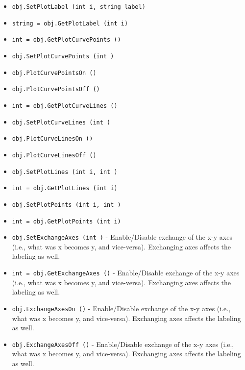 \begin{itemize}
\item  \verb|obj.SetPlotLabel (int i, string label)|

\item  \verb|string = obj.GetPlotLabel (int i)|

\item  \verb|int = obj.GetPlotCurvePoints ()|

\item  \verb|obj.SetPlotCurvePoints (int )|

\item  \verb|obj.PlotCurvePointsOn ()|

\item  \verb|obj.PlotCurvePointsOff ()|

\item  \verb|int = obj.GetPlotCurveLines ()|

\item  \verb|obj.SetPlotCurveLines (int )|

\item  \verb|obj.PlotCurveLinesOn ()|

\item  \verb|obj.PlotCurveLinesOff ()|

\item  \verb|obj.SetPlotLines (int i, int )|

\item  \verb|int = obj.GetPlotLines (int i)|

\item  \verb|obj.SetPlotPoints (int i, int )|

\item  \verb|int = obj.GetPlotPoints (int i)|

\item  \verb|obj.SetExchangeAxes (int )| -  Enable/Disable exchange of the x-y axes (i.e., what was x becomes y, and
 vice-versa). Exchanging axes affects the labeling as well.

\item  \verb|int = obj.GetExchangeAxes ()| -  Enable/Disable exchange of the x-y axes (i.e., what was x becomes y, and
 vice-versa). Exchanging axes affects the labeling as well.

\item  \verb|obj.ExchangeAxesOn ()| -  Enable/Disable exchange of the x-y axes (i.e., what was x becomes y, and
 vice-versa). Exchanging axes affects the labeling as well.

\item  \verb|obj.ExchangeAxesOff ()| -  Enable/Disable exchange of the x-y axes (i.e., what was x becomes y, and
 vice-versa). Exchanging axes affects the labeling as well.


\end{itemize}

